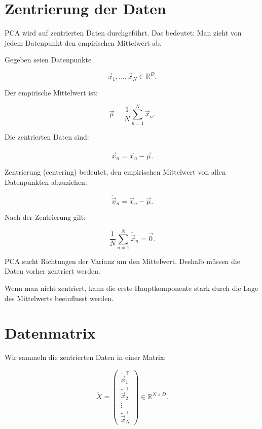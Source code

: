 \section{Zentrierung der Daten}

PCA wird auf zentrierten Daten durchgeführt.
Das bedeutet:
Man zieht von jedem Datenpunkt den empirischen Mittelwert ab.

Gegeben seien Datenpunkte

\[
    \vec{x}_1,\dots,\vec{x}_N
    \in
    \mathbb{R}^D.
\]

Der empirische Mittelwert ist:

\[
    \vec{\mu}
    =
    \frac{1}{N}
    \sum_{n=1}^{N}
    \vec{x}_n.
\]

Die zentrierten Daten sind:

\[
    \tilde{\vec{x}}_n
    =
    \vec{x}_n-\vec{\mu}.
\]

\begin{definitionbox}
Zentrierung (centering) bedeutet, den empirischen Mittelwert von allen Datenpunkten abzuziehen:

\[
    \tilde{\vec{x}}_n
    =
    \vec{x}_n-\vec{\mu}.
\]
\end{definitionbox}

Nach der Zentrierung gilt:

\[
    \frac{1}{N}
    \sum_{n=1}^{N}
    \tilde{\vec{x}}_n
    =
    \vec{0}.
\]

\begin{notebox}
PCA sucht Richtungen der Varianz um den Mittelwert.
Deshalb müssen die Daten vorher zentriert werden.

Wenn man nicht zentriert, kann die erste Hauptkomponente stark durch die Lage des Mittelwerts beeinflusst werden.
\end{notebox}

\section{Datenmatrix}

Wir sammeln die zentrierten Daten in einer Matrix:

\[
    \tilde{X}
    =
    \begin{pmatrix}
        \tilde{\vec{x}}_1^{\top} \\
        \tilde{\vec{x}}_2^{\top} \\
        \vdots \\
        \tilde{\vec{x}}_N^{\top}
    \end{pmatrix}
    \in
    \mathbb{R}^{N\times D}.
\]

